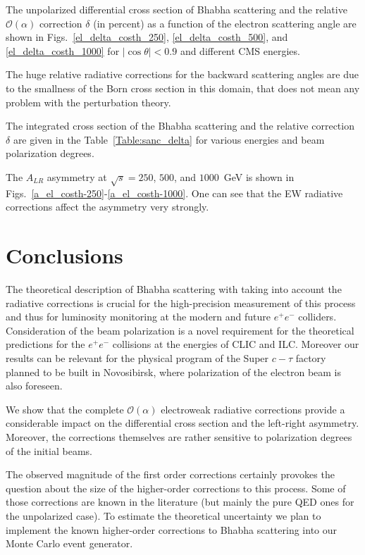 \documentclass[%
 reprint,
amsmath,
amssymb,
 aps,
 prb,
 floatfix,
]{revtex4-1}
\begin{document}
The unpolarized differential cross section of Bhabha scattering
and the relative ${\mathcal{O}}(\alpha)$ 
correction $\delta$ (in percent) as a function
of the electron scattering angle are shown in Figs.~\ref{el_delta_costh_250},
\ref{el_delta_costh_500}, and \ref{el_delta_costh_1000} for $|\cos\theta|<0.9$
and different CMS energies.

The huge relative radiative corrections for the
backward scattering angles are due to the smallness of the Born cross section 
in this domain, that does not mean any problem with the perturbation theory.

The integrated cross section of the Bhabha scattering and the relative
correction $\delta$ are given in the Table~\ref{Table:sanc_delta} for
various energies and beam polarization degrees.

The $A_{LR}$ asymmetry at $\sqrt{s}=250$, $500$, and $1000$~GeV
is shown in Figs.~\ref{a_el_costh-250}-\ref{a_el_costh-1000}. 
One can see that the EW radiative corrections affect the asymmetry very strongly.

\section{Conclusions}

The theoretical description of Bhabha scattering with taking into account the radiative 
corrections is crucial for the high-precision measurement of this process 
and thus for luminosity monitoring at the modern and future $e^+e^-$ colliders.
Consideration of the beam polarization is a novel requirement
for the theoretical predictions for the $e^+e^-$ collisions at the energies of CLIC and ILC.
Moreover our results can be relevant for the physical program of the 
Super $c-\tau$ factory~\cite{Eidelman:2015wja} planned to be built in Novosibirsk,
where polarization of the electron beam is also foreseen.

We show that the complete ${\mathcal{O}}(\alpha)$ electroweak radiative corrections 
provide a considerable impact on the differential cross section and the
left-right asymmetry. Moreover, the corrections themselves are rather sensitive 
to polarization degrees of the initial beams.

The observed  magnitude of the first order corrections certainly 
provokes the question about the size of the higher-order corrections to this process.
Some of those corrections are known in the literature (but mainly the pure QED ones 
for the unpolarized case). To estimate the theoretical uncertainty we plan to implement
the known higher-order corrections to Bhabha scattering into our Monte Carlo 
event generator.
\end{document}
